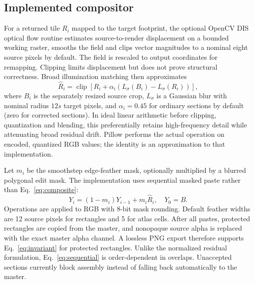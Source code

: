 \documentclass[10pt,twocolumn]{article}
\begin{document}
\subsection{Implemented compositor}
For a returned tile $R_i$ mapped to the target footprint, the optional OpenCV DIS optical flow routine estimates source-to-render displacement on a bounded working raster, smooths the field and clips vector magnitudes to a nominal eight source pixels by default. The field is rescaled to output coordinates for remapping. Clipping limits displacement but does not prove structural correctness. Broad illumination matching then approximates
\begin{equation}
\widehat R_i=\operatorname{clip}[R_i+\alpha_i(L_\sigma(B_i)-L_\sigma(R_i))],
\label{eq:implementedcolor}
\end{equation}
where $B_i$ is the separately resized source crop, $L_\sigma$ is a Gaussian blur with nominal radius $12s$ target pixels, and $\alpha_i=0.45$ for ordinary sections by default (zero for corrected sections). In ideal linear arithmetic before clipping, quantization and blending, this preferentially retains high-frequency detail while attenuating broad residual drift. Pillow performs the actual operation on encoded, quantized RGB values; the identity is an approximation to that implementation.

Let $m_i$ be the smoothstep edge-feather mask, optionally multiplied by a blurred polygonal edit mask. The implementation uses sequential masked paste rather than Eq.~\eqref{eq:composite}:
\begin{equation}
Y_i=(1-m_i)Y_{i-1}+m_i\widehat R_i,\quad Y_0=B.
\label{eq:sequential}
\end{equation}
Operations are applied to RGB with 8-bit mask rounding. Default feather widths are 12 source pixels for rectangles and 5 for atlas cells. After all pastes, protected rectangles are copied from the master, and nonopaque source alpha is replaced with the exact master alpha channel. A lossless PNG export therefore supports Eq.~\eqref{eq:invariant} for protected rectangles. Unlike the normalized residual formulation, Eq.~\eqref{eq:sequential} is order-dependent in overlaps. Unaccepted sections currently block assembly instead of falling back automatically to the master.
\end{document}
